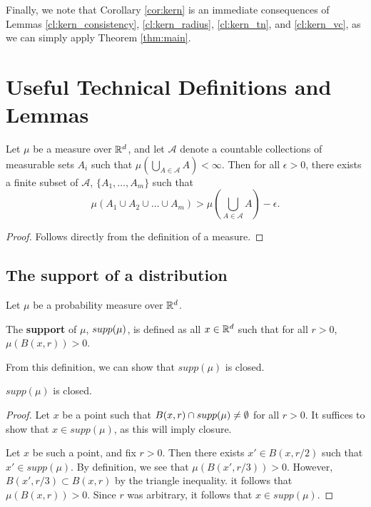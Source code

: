 Finally, we note that Corollary \ref{cor:kern} is an immediate consequences of Lemmas \ref{cl:kern_consistency}, \ref{cl:kern_radius}, \ref{cl:kern_tn}, and \ref{cl:kern_vc}, as we can simply apply Theorem \ref{thm:main}.

\section{Useful Technical Definitions and Lemmas}\label{sec:useful_lemmas}

\begin{lem}\label{lem:measure_lemma}
Let $\mu$ be a measure over $\mathbb R^d$, and let $\mathcal{A}$ denote a countable collections of measurable sets $A_i$ such that $\mu(\bigcup_{A \in \mathcal{A}} A) < \infty$. Then for all $\epsilon > 0$, there exists a finite subset of $\mathcal{A}$, $\{A_1, \dots, A_m\}$ such that $$\mu(A_1 \cup A_2 \cup \dots \cup A_m) > \mu(\bigcup_{A \in \mathcal{A}} A) - \epsilon.$$ 
\end{lem}

\begin{proof}
Follows directly from the definition of a measure.
\end{proof}

\subsection{The support of a distribution}\label{sec:distribution_details}

Let $\mu$ be a probability measure over $\mathbb R^d$.

\begin{defn}
The \textbf{support} of $\mu$, $supp(\mu)$, is defined as all $x \in \mathbb R^d$ such that for all $r > 0$, $\mu(B(x, r)) > 0$. 
\end{defn}

From this definition, we can show that $supp(\mu)$ is closed.

\begin{lem}
$supp(\mu)$ is closed.
\end{lem}

\begin{proof}
Let $x$ be a point such that $B(x, r) \cap supp(\mu) \neq \emptyset$ for all $r > 0$. It suffices to show that $x \in supp(\mu)$, as this will imply closure. 

Let $x$ be such a point, and fix $r > 0$. Then there exists $x' \in B(x, r/2)$ such that $x' \in supp(\mu)$. By definition, we see that $\mu(B(x', r/3)) > 0$. However, $B(x', r/3) \subset B(x, r)$ by the triangle inequality. it follows that $\mu(B(x,r)) > 0$. Since $r$ was arbitrary, it follows that $x \in supp(\mu)$.
\end{proof}

